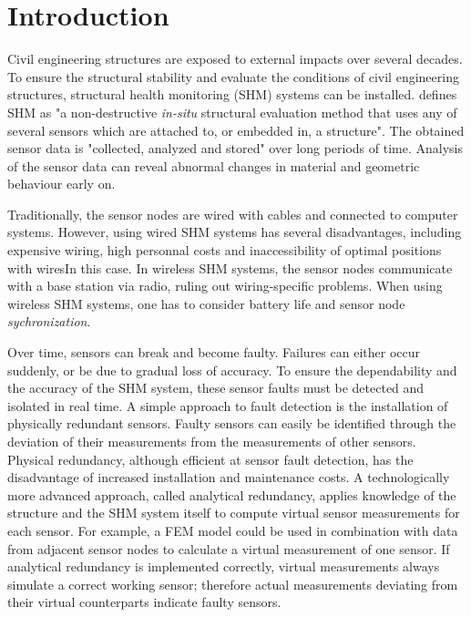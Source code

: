 \documentclass[12pt]{scrartcl}
\begin{document}

\section*{Introduction}

Civil engineering structures are exposed to external impacts over several decades. 
To ensure the structural stability and evaluate the conditions of civil engineering structures, structural health monitoring (SHM) systems can be installed.
\cite[4]{BisbySHM} defines SHM as "a non-destructive \textit{in-situ} structural evaluation method that uses any of several sensors which are attached to, or embedded in, a structure". 
The obtained sensor data is "collected, analyzed and stored" over long periods of time.
Analysis of the sensor data can reveal abnormal changes in material and geometric behaviour early on.

Traditionally, the sensor nodes are wired with cables and connected to computer systems.
However, using wired SHM systems has several disadvantages, including expensive wiring, high personnal costs and inaccessibility of optimal positions with wiresIn this case.
In wireless SHM systems, the sensor nodes communicate with a base station via radio, ruling out wiring-specific problems.
When using wireless SHM systems, one has to consider battery life and sensor node \textit{sychronization}.

Over time, sensors can break and become faulty. Failures can either occur suddenly, or be due to gradual loss of accuracy.
To ensure the dependability and the accuracy of the SHM system, these sensor faults must be detected and isolated in real time. 
A simple approach to fault detection is the installation of physically redundant sensors.
Faulty sensors can easily be identified through the deviation of their measurements from the measurements of other sensors.
Physical redundancy, although efficient at sensor fault detection, has the disadvantage of increased installation and maintenance costs. 
A technologically more advanced approach, called analytical redundancy, applies knowledge of the structure and the SHM system itself to compute virtual sensor measurements for each sensor. 
For example, a FEM model could be used in combination with data from adjacent sensor nodes to calculate a virtual measurement of one sensor.
If analytical redundancy is implemented correctly, virtual measurements always simulate a correct working sensor; therefore actual measurements deviating from their virtual counterparts indicate faulty sensors.\citep{Smarsly2014}
\end{document}
